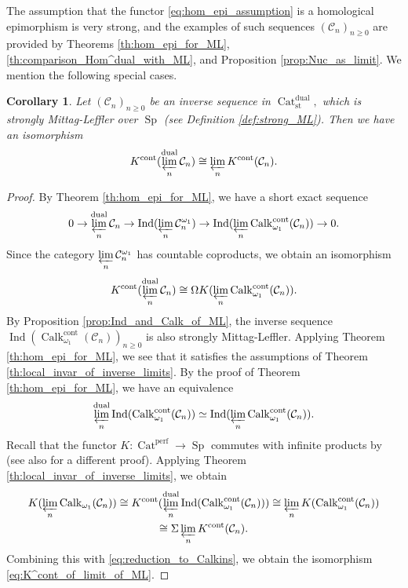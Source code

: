 \documentclass[11pt,leqno]{amsart}
\newtheorem{cor}[theo]{Corollary}
\numberwithin{equation}{section}
\newcommand{\prolim}[1][]{\mathop{\varprojlim}\limits_{#1}}
\newcommand{\Cat}{\operatorname{Cat}}
\newcommand{\cont}{\operatorname{cont}}
\newcommand{\st}{\operatorname{st}}
\newcommand{\dual}{\operatorname{dual}}
\newcommand{\cC}{{\mathcal C}}
\newcommand{\perf}{\operatorname{perf}}
\newcommand{\Sp}{\operatorname{Sp}}
\newcommand{\Ind}{\operatorname{Ind}}
\newcommand{\Calk}{\operatorname{Calk}}
\begin{document}
The assumption that the functor \eqref{eq:hom_epi_assumption} is a homological epimorphism is very strong, and the examples of such sequences $(\cC_n)_{n\geq 0}$ are provided by Theorems \ref{th:hom_epi_for_ML}, \ref{th:comparison_Hom^dual_with_ML}, and Proposition \ref{prop:Nuc_as_limit}. We mention the following special cases.

\begin{cor}\label{cor:K_theory_of_limit_of_ML} Let $(\cC_n)_{n\geq 0}$ be an inverse sequence in $\Cat_{\st}^{\dual},$ which is strongly Mittag-Leffler over $\Sp$ (see Definition \ref{def:strong_ML}). Then we have an isomorphism
\begin{equation}\label{eq:K^cont_of_limit_of_ML}
K^{\cont}(\prolim[n]^{\dual}\cC_n)\cong \prolim[n] K^{\cont}(\cC_n). 
\end{equation}
\end{cor}

\begin{proof}
By Theorem \ref{th:hom_epi_for_ML}, we have a short exact sequence
\begin{equation*}
0\to \prolim[n]^{\dual}\cC_n\to \Ind(\prolim[n]\cC_n^{\omega_1})\to \Ind(\prolim[n]\Calk_{\omega_1}^{\cont}(\cC_n))\to 0.
\end{equation*}
Since the category $\prolim[n]\cC_n^{\omega_1}$ has countable coproducts, we obtain an isomorphism
\begin{equation}\label{eq:reduction_to_Calkins}
K^{\cont}(\prolim[n]^{\dual}\cC_n)\cong \Omega K(\prolim[n]\Calk_{\omega_1}^{\cont}(\cC_n)).
\end{equation}
By Proposition \ref{prop:Ind_and_Calk_of_ML}, the inverse sequence $\Ind(\Calk_{\omega_1}^{\cont}(\cC_n))_{n\geq 0}$ is also strongly Mittag-Leffler. Applying Theorem \ref{th:hom_epi_for_ML}, we see that it satisfies the assumptions of Theorem \ref{th:local_invar_of_inverse_limits}. By the proof of Theorem \ref{th:hom_epi_for_ML}, we have an equivalence
\begin{equation*}
\prolim[n]^{\dual}\Ind(\Calk_{\omega_1}^{\cont}(\cC_n))\simeq\Ind(\prolim[n]\Calk_{\omega_1}^{\cont}(\cC_n)).
\end{equation*} 
Recall that the functor $K:\Cat^{\perf}\to\Sp$ commutes with infinite products by \cite[Theorem 1.3]{KW19} (see also \cite[Theorem 4.28]{E24} for a different proof). Applying Theorem \ref{th:local_invar_of_inverse_limits}, we obtain
\begin{multline*}
K(\prolim[n]\Calk_{\omega_1}(\cC_n))\cong K^{\cont}(\prolim[n]^{\dual}\Ind(\Calk_{\omega_1}^{\cont}(\cC_n)))\cong\prolim[n]K(\Calk_{\omega_1}^{\cont}(\cC_n))\\
\cong \Sigma \prolim[n]K^{\cont}(\cC_n).
\end{multline*}
Combining this with \eqref{eq:reduction_to_Calkins}, we obtain the isomorphism \eqref{eq:K^cont_of_limit_of_ML}.
\end{proof}
\end{document}
